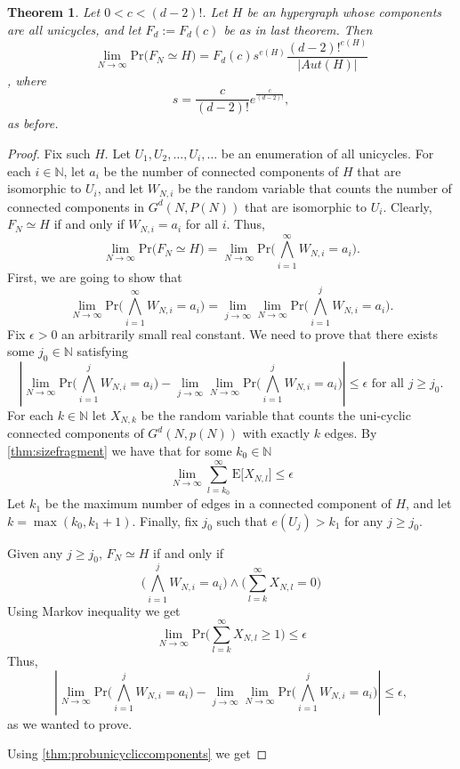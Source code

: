 \documentclass[11pt,notitlepage,a4paper]{article}
\newtheorem{theorem}{Theorem}[section]
\theoremstyle{definition}
\newcommand{\N}{\mathbb{N}}
\newcommand{\LN}{\lim\limits_{N\to \infty}}
\begin{document}
\begin{theorem} 
	Let $0<c<(d-2)!$.
	Let $H$ be an hypergraph whose components are all 
	unicycles, and let  $F_d:=F_d(c)$ be as in last theorem. 
	Then
	\[
	\LN \mathrm{Pr}\Big(F_N\simeq H\Big)=F_d(c)
	s^{e(H)} \frac{(d-2)!^{e(H)}}{|Aut(H)|}
	\],
	where 
	\[
	s=\frac{c}{(d-2)!}e^{\frac{c}{(d-2)!}},
	\]
	as before.
\end{theorem}

\begin{proof}
	Fix such $H$.
	Let $U_1,U_2,\dots, U_i,\dots$ be an enumeration of all unicycles.
	For each $i\in \N$, let $a_i$
	be the number of connected components of $H$ that are isomorphic to $U_i$,
	and let $W_{N,i}$ be the random variable that counts the number of connected 
	components in $G^d(N,P(N))$ that are isomorphic to $U_i$. Clearly,
	$F_N\simeq H$ if and only if $W_{N,i}=a_i$ for all $i$.  Thus,
	\[
	\LN \mathrm{Pr}\big(F_N\simeq H\big)= 
	\LN \mathrm{Pr}\big( \bigwedge_{i=1}^\infty W_{N,i}=a_i\big).
	\]
	First, we are going to show that 
	\[
	\LN \mathrm{Pr}\big( \bigwedge_{i=1}^\infty W_{N,i}=a_i\big)=
	\lim\limits_{j\to \infty}
	\LN \mathrm{Pr}\big( \bigwedge_{i=1}^j W_{N,i}=a_i\big).
	\]
	Fix $\epsilon > 0$ an arbitrarily small real constant. We need
	to prove that there exists some $j_0\in \N$ satisfying
	\[
	\left|\LN \mathrm{Pr}\big( \bigwedge_{i=1}^j W_{N,i}=a_i\big)
	- \lim\limits_{j\to \infty}
	\LN \mathrm{Pr}\big( \bigwedge_{i=1}^j W_{N,i}=a_i\big)
	\right|
	\leq \epsilon
	\text{ for all } j\geq j_0.
	\]
	For each $k \in \N$ let $X_{N,k}$ be the random variable
	that counts the uni-cyclic connected components of $G^d(N,p(N))$
	with exactly $k$ edges.	By \cref{thm:sizefragment}
	we have that for some $k_0\in \N$
	\[ 
	\LN \sum_{l=k_0}^{\infty }\mathrm{E}\big[ X_{N,l} \big] \leq 
	\epsilon
	\]
	Let $k_1$ be the maximum number of edges in a connected component of 
	$H$, and let $k = \max(k_0, k_1+1)$. Finally, fix $j_0$ such that 
	$e(U_j)>k_1$ for any $j\geq j_0$. \par
	Given any $j\geq j_0$, $F_N \simeq H$ if and only if 
	\[
	\big(\bigwedge_{i=1}^{j} W_{N,i}=a_i\big) \wedge
	\big(\sum_{l=k}^\infty X_{N,l}=0  \big) 
	\]
	Using Markov inequality we get 
	\[
	\LN \mathrm{Pr}\big( \sum_{l=k}^\infty X_{N,l}\geq 1  \big) \leq \epsilon
	\]
	Thus,
	\[
	\left|\LN \mathrm{Pr}\big( \bigwedge_{i=1}^j W_{N,i}=a_i\big)
	- \lim\limits_{j\to \infty}
	\LN \mathrm{Pr}\big( \bigwedge_{i=1}^j W_{N,i}=a_i\big)
	\right|
	\leq \epsilon,
	\]
	as we wanted to prove. 	\par
	Using \cref{thm:probunicycliccomponents} we get

\end{proof}
\end{document}
